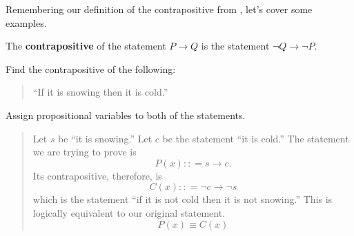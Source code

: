 Remembering our definition of the contrapositive from ,
let's cover some examples.

\begin{defn}
  The \textbf{contrapositive} of the statement $P \to Q$
  is the statement $\neg Q \to \neg P$.
\end{defn}

\begin{ex}
  Find the contrapositive of the following:
  \begin{quote}
    ``If it is snowing then it is cold.''
  \end{quote}
  \begin{sol}
    Assign propositional variables to both of the statements.
    \begin{quote}
      Let $s$ be ``it is snowing.'' Let $c$ be the statement ``it is cold.''
      The statement we are trying to prove is
      \[ P(x) : : = s\to c.\]
      Its contrapositive, therefore, is
      \[ C(x) : : = \neg c \to \neg s \]
      which is the statement ``if it is not cold then it is not snowing.''
      This is logically equivalent to our original statement.
      \[ P(x) \equiv C(x) \]
    \end{quote}
  \end{sol}
\end{ex}
